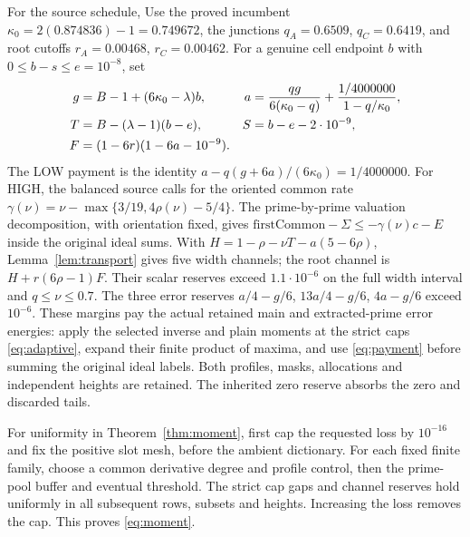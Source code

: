 \documentclass[10pt,a4paper]{article}
\newcommand{\kap}{\kappa}
\begin{document}
For the source schedule, Use the proved incumbent
$\kap_0=2(0.874836)-1=0.749672$, the junctions
$q_A=0.6509$, $q_C=0.6419$, and root cutoffs
$r_A=0.00468$, $r_C=0.00462$. For a genuine cell endpoint $b$ with
$0\le b-s\le e=10^{-8}$, set
\begin{align}\label{eq:schedule}
 g&=B-1+(6\kap_0-\lambda)b,&
 a&=\frac{qg}{6(\kap_0-q)}+\frac{1/4000000}{1-q/\kap_0},\notag\\
 T&=B-(\lambda-1)(b-e),&S&=b-e-2\cdot10^{-9},\notag\\
 F&=(1-6r)(1-6a-10^{-9}).&&
\end{align}
The LOW payment is the identity $a-q(g+6a)/(6\kap_0)=1/4000000$.
For HIGH, the balanced source calls for the oriented common rate
$\gamma(\nu)=\nu-\max\{3/19,4\rho(\nu)-5/4\}$.
The prime-by-prime valuation decomposition, with orientation fixed,
gives $\mathrm{firstCommon}-\Sigma\le-\gamma(\nu)c-E$ inside
the original ideal sums.
With $H=1-\rho-\nu T-a(5-6\rho)$,
Lemma~\ref{lem:transport} gives five width channels; the root channel
is $H+r(6\rho-1)F$. Their scalar reserves exceed $1.1\cdot10^{-6}$
on the full width interval and $q\le\nu\le0.7$.
The three error reserves $a/4-g/6$, $13a/4-g/6$, $4a-g/6$ exceed
$10^{-6}$. These margins pay the actual retained main and extracted-prime error
energies: apply the selected inverse and plain moments at the strict
caps \eqref{eq:adaptive}, expand their finite product of maxima,
and use \eqref{eq:payment} before summing the original ideal labels.
Both profiles, masks, allocations and independent heights are retained.
The inherited zero reserve absorbs the zero and discarded tails.

For uniformity in Theorem~\ref{thm:moment}, first cap the requested
loss by $10^{-16}$ and fix the positive slot mesh, before the ambient
dictionary. For each fixed finite family, choose a common derivative
degree and profile control, then the prime-pool buffer and eventual
threshold. The strict cap gaps and channel reserves hold uniformly in
all subsequent rows, subsets and heights. Increasing the loss removes
the cap. This proves \eqref{eq:moment}.

\newpage
\end{document}
